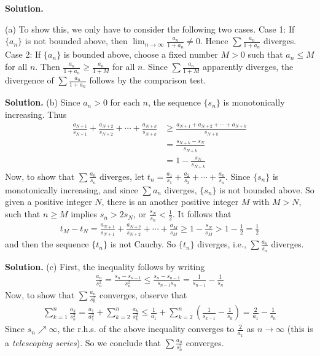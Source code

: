 \documentclass[12pt]{article}
\theoremstyle{definition}
\begin{document}
\smallskip
\noindent\textbf{Solution.}\quad

(a) To show this, we only have to consider the following two cases.
Case 1: If $\{a_n\}$ is not bounded above, then $\lim_{n\to\infty}\frac{a_n}{1+a_n}\ne 0$. Hence $\sum\frac{a_n}{1+a_n}$ diverges.
Case 2: If $\{a_n\}$ is bounded above, choose a fixed number $M>0$ such that $a_n\le M$ for all $n$. Then $\frac{a_n}{1+a_n}\ge\frac{a_n}{1+M}$ for all $n$. Since $\sum\frac{a_n}{1+M}$ apparently diverges, the divergence of $\sum\frac{a_n}{1+a_n}$ follows by the comparison test.

\smallskip
\noindent\textbf{Solution.}\quad
(b) Since $a_n>0$ for each $n$, the sequence $\{s_n\}$ is monotonically increasing. Thus
\begin{align*}
\frac{a_{N+1}}{s_{N+1}}+\frac{a_{N+2}}{s_{N+2}}+\cdots+\frac{a_{N+k}}{s_{N+k}}
&\ge\frac{a_{N+1}+a_{N+2}+\cdots+a_{N+k}}{s_{N+k}} \\
&=\frac{s_{N+k}-s_N}{s_{N+k}} \\
&=1-\frac{s_N}{s_{N+k}}
\end{align*}
Now, to show that $\sum\frac{a_n}{s_n}$ diverges, let $t_n=\frac{a_1}{s_1}+\frac{a_2}{s_2}+\cdots+\frac{a_n}{s_n}$. Since $\{s_n\}$ is monotonically increasing, and since $\sum a_n$ diverges, $\{s_n\}$ is not bounded above. So given a positive integer $N$, there is an another positive integer $M$ with $M>N$, such that $n\ge M$ implies $s_n>2s_N$, or $\frac{s_N}{s_n}<\frac{1}{2}$. It follows that
\begin{align*}
t_M-t_N
=\frac{a_{N+1}}{s_{N+1}}+\frac{a_{N+2}}{s_{N+2}}+\cdots+\frac{a_{M}}{s_{M}}
\ge1-\frac{s_N}{s_{M}}
>1-\frac{1}{2}
=\frac{1}{2}
\end{align*}
and then the sequence $\{t_n\}$ is not Cauchy. So $\{t_n\}$ diverges, i.e., $\sum\frac{a_n}{s_n}$ diverges.

\smallskip
\noindent\textbf{Solution.}\quad
(c) First, the inequality follows by writing
\begin{align*}
\frac{a_n}{s_n^2}
=\frac{s_n-s_{n-1}}{s_n^2}
\le\frac{s_n-s_{n-1}}{s_{n-1}s_n}
=\frac{1}{s_{n-1}}-\frac{1}{s_n}
\end{align*}
Now, to show that $\sum\frac{a_n}{s_n^2}$ converges, observe that
\begin{align*}
\sum_{k=1}^n\frac{a_k}{s_k^2}
=\frac{a_1}{a_1^2}+\sum_{k=2}^n\frac{a_k}{s_k^2}
\le\frac{1}{a_1}+\sum_{k=2}^n\left(\frac{1}{s_{k-1}}-\frac{1}{s_k}\right)
=\frac{2}{a_1}-\frac{1}{s_n}
\end{align*}
Since $s_n\nearrow\infty$, the r.h.s. of the above inequality converges to $\frac{2}{a_1}$ as $n\to\infty$ (this is a \textit{telescoping series}). So we conclude that $\sum\frac{a_n}{s_n^2}$ converges.
\end{document}

